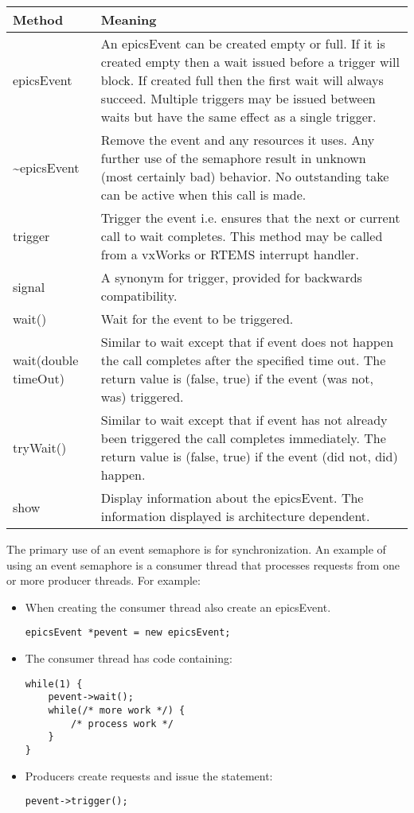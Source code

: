 \begin{center}
\begin{longtable}{p{1.25in}p{5.0in}}
\textbf{Method} & \textbf{Meaning}\\
\hline
epicsEvent & An epicsEvent can be created empty or full.
If it is created empty then a wait issued before a trigger will block.
If created full then the first wait will always succeed.
Multiple triggers may be issued between waits but have the same effect as a single trigger.\\
\~{}epicsEvent & Remove the event and any resources it uses.
Any further use of the semaphore result in unknown (most certainly bad) behavior.
No outstanding take can be active when this call is made.\\
trigger & Trigger the event i.e. ensures that the next or current call to wait completes.
This method may be called from a vxWorks or RTEMS interrupt handler.\\
signal & A synonym for trigger, provided for backwards compatibility.\\
wait() & Wait for the event to be triggered.\\
wait(double timeOut) & Similar to wait except that if event does not happen the call completes after the specified time out.
The return value is (false, true) if the event (was not, was) triggered.\\
tryWait() & Similar to wait except that if event has not already been triggered the call completes immediately.
The return value is (false, true) if the event (did not, did) happen.\\
show & Display information about the epicsEvent.
The information displayed is architecture dependent.
\end{longtable}
\end{center}

The primary use of an event semaphore is for synchronization.
An example of using an event semaphore is a consumer thread that processes requests from one or more producer threads.
For example:

\begin{itemize}
\item When creating the consumer thread also create an epicsEvent.

\begin{verbatim}
epicsEvent *pevent = new epicsEvent;
\end{verbatim}

\item The consumer thread has code containing:

\begin{verbatim}
while(1) {
    pevent->wait();
    while(/* more work */) {
        /* process work */
    }
}
\end{verbatim}

\item Producers create requests and issue the statement:

\begin{verbatim}
pevent->trigger();
\end{verbatim}

\end{itemize}

